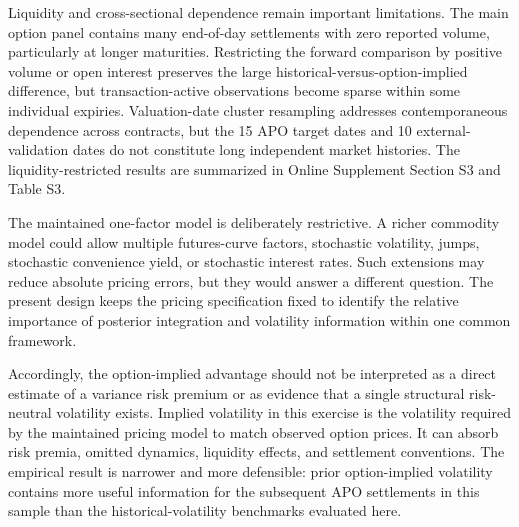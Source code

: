 Liquidity and cross-sectional dependence remain important limitations. The main option panel contains many end-of-day settlements with zero reported volume, particularly at longer maturities. Restricting the forward comparison by positive volume or open interest preserves the large historical-versus-option-implied difference, but transaction-active observations become sparse within some individual expiries. Valuation-date cluster resampling addresses contemporaneous dependence across contracts, but the 15 APO target dates and 10 external-validation dates do not constitute long independent market histories. The liquidity-restricted results are summarized in Online Supplement Section S3 and Table S3.

The maintained one-factor model is deliberately restrictive. A richer commodity model could allow multiple futures-curve factors, stochastic volatility, jumps, stochastic convenience yield, or stochastic interest rates. Such extensions may reduce absolute pricing errors, but they would answer a different question. The present design keeps the pricing specification fixed to identify the relative importance of posterior integration and volatility information within one common framework.

Accordingly, the option-implied advantage should not be interpreted as a direct estimate of a variance risk premium or as evidence that a single structural risk-neutral volatility exists. Implied volatility in this exercise is the volatility required by the maintained pricing model to match observed option prices. It can absorb risk premia, omitted dynamics, liquidity effects, and settlement conventions. The empirical result is narrower and more defensible: prior option-implied volatility contains more useful information for the subsequent APO settlements in this sample than the historical-volatility benchmarks evaluated here.
